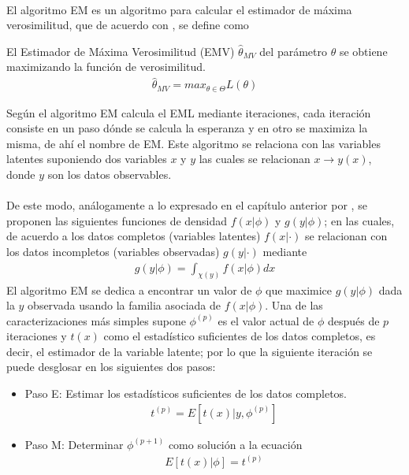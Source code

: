 \\
El algoritmo EM es un algoritmo para calcular el estimador de m\'axima verosimilitud, que de acuerdo con \cite{held2014applied}, se define como
\begin{defi}
El Estimador de M\'axima Verosimilitud (EMV) $\hat{\theta}_{MV}$ del par\'ametro $\theta$ se obtiene maximizando la funci\'on de verosimilitud.
\begin{align*}
\hat{\theta}_{MV}=max_{\theta \in \Theta} L(\theta)
\end{align*} 
\end{defi}
Seg\'un \cite{dempster1977maximum} el algoritmo EM calcula el EML mediante iteraciones, cada iteraci\'on consiste en un paso d\'onde se calcula la esperanza y en otro  se maximiza la misma, de ah\'i el nombre de EM. Este algoritmo se relaciona con las variables latentes suponiendo dos variables $x$ y $y$ las cuales se relacionan $x \to y(x)$, donde $y$ son los datos observables.\\
\\
De este modo, an\'alogamente a lo expresado en el cap\'itulo anterior por \cite{pitt2002constructing}, se proponen las siguientes funciones de densidad $f(x|\phi)$ y $g(y|\phi)$; en las cuales, de acuerdo a \cite{dempster1977maximum} los datos completos (variables latentes) $f(x|\cdot)$ se relacionan con los datos incompletos (variables observadas) $g(y|\cdot)$ mediante
\begin{align*}
g(y|\phi)=\int_{\chi(y)} f(x|\phi)dx
\end{align*}
El algoritmo EM se dedica a encontrar un valor de $\phi$ que maximice $g(y|\phi)$ dada la $y$ observada usando la familia asociada de $f(x|\phi)$. Una de las caracterizaciones m\'as simples supone $\phi^{(p)}$ es el valor actual de $\phi$ despu\'es de $p$ iteraciones y $t(x)$ como el estad\'istico suficientes de los datos completos, es decir, el estimador de la variable latente; por lo que la siguiente iteraci\'on se puede desglosar en los siguientes dos pasos:
\begin{itemize}
\item Paso E: Estimar los estad\'isticos suficientes de los datos completos.
	\begin{align*}
	t^{(p)}=E[t(x)|y,\phi^{(p)}]
	\end{align*}
\item Paso M: Determinar $\phi^{(p+1)}$ como soluci\'on a la ecuaci\'on
	\begin{align*}
	E[t(x)|\phi]=t^{(p)}
	\end{align*}
\end{itemize}
